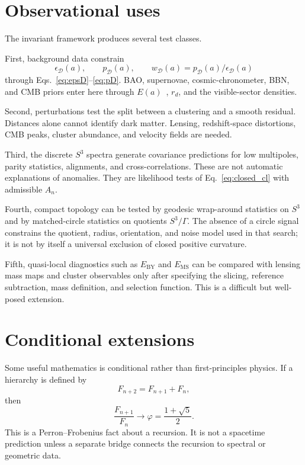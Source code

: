 \documentclass[
  aps,
  prd,
  reprint,
  superscriptaddress,
  nofootinbib,
  floatfix,
  longbibliography
]{revtex4-2}
\newcommand{\D}{\mathcal D}
\newcommand{\BY}{\mathrm{BY}}
\newcommand{\MS}{\mathrm{MS}}
\begin{document}
\section{Observational uses}
\label{sec:observational}

The invariant framework produces several test classes.

First, background data constrain
\begin{equation}
  \epsilon_\D(a),\qquad p_\D(a),\qquad
  w_\D(a)=p_\D(a)/\epsilon_\D(a)
\end{equation}
through Eqs.~\eqref{eq:epsD}--\eqref{eq:pD}.  BAO, supernovae,
cosmic-chronometer, BBN, and CMB priors enter here through \(E(a)\)~\cite{Planck2018VI,Planck2018VII,PlanckPR4CamSpec,DESIDR2BAO2025,DESIDR2Lya2025,DESIDR2DE2025,PantheonPlus2022,Moresco2022,ACTDR62024},
\(r_d\), and the visible-sector densities.

Second, perturbations test the split between a clustering and a smooth
residual.  Distances alone cannot identify dark matter.  Lensing,
redshift-space distortions, CMB peaks, cluster abundance, and velocity
fields are needed.

Third, the discrete \(S^3\) spectra generate covariance predictions for
low multipoles, parity statistics, alignments, and cross-correlations.
These are not automatic explanations of anomalies.  They are likelihood
tests of Eq.~\eqref{eq:closed_cl} with admissible \(A_n\).

Fourth, compact topology can be tested by geodesic wrap-around
statistics on \(S^3\) and by matched-circle statistics on quotients
\(S^3/\Gamma\).  The absence of a circle signal constrains the quotient,
radius, orientation, and noise model used in that search; it is not by
itself a universal exclusion of closed positive curvature.

Fifth, quasi-local diagnostics such as \(E_{\BY}\) and \(E_{\MS}\) can
be compared with lensing mass maps and cluster observables only after
specifying the slicing, reference subtraction, mass definition, and
selection function.  This is a difficult but well-posed extension.

\section{Conditional extensions}
\label{sec:conditional}

Some useful mathematics is conditional rather than first-principles
physics.  If a hierarchy is defined by
\begin{equation}
  F_{n+2}=F_{n+1}+F_n ,
\end{equation}
then
\begin{equation}
  \frac{F_{n+1}}{F_n}\to
  \varphi=\frac{1+\sqrt5}{2}.
\end{equation}
This is a Perron--Frobenius fact about a recursion.  It is not a
spacetime prediction unless a separate bridge connects the recursion to
spectral or geometric data.
\end{document}
